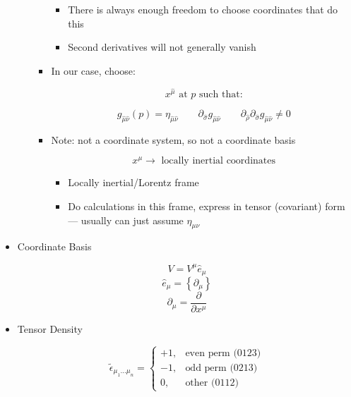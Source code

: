 \begin{itemize}
\begin{itemize}
\begin{itemize}
            \begin{itemize}

              \item There is always enough freedom to choose coordinates that do this

              \item Second derivatives will not generally vanish

            \end{itemize}

          \item In our case, choose:

            $$x^{\hat{\mu}} \text{ at }p\text{ such that:}$$

            $$g_{\hat{\mu}\hat{\nu}}(p)=\eta_{\hat{\mu}\hat{\nu}}\quad\quad\partial_{\hat{\sigma}}g_{\hat{\mu}\hat{\nu}}\quad\quad \partial_{\hat{\rho}}\partial_{\hat{\sigma}}g_{\hat{\mu}\hat{\nu}}\neq0$$

          \item Note: not a coordinate system, so not a coordinate basis

            $$x^{\mu}\to\text{ locally inertial coordinates}$$

            \begin{itemize}

              \item Locally inertial/Lorentz frame

              \item Do calculations in this frame, express in tensor (covariant) form — usually can just assume $\eta_{\mu\nu}$

            \end{itemize}

        \end{itemize}

    \end{itemize}

  \item Coordinate Basis

    $$V=V^{\mu}\hat{e}_{\mu}$$
    $$\hat{e}_{\mu}=\left\{ \partial_{\mu} \right\}$$
    $$\partial_{\mu}=\frac{\partial}{\partial x^{\mu}}$$

  \item Tensor Density

    $$\tilde{\epsilon}_{\mu_1\ldots\mu_n}=\left\{ \begin{matrix} +1, & \text{even perm (0123)}\\ -1, & \text{odd perm (0213)}\\ 0, & \text{other (0112)}\end{matrix}$$


\end{itemize}
